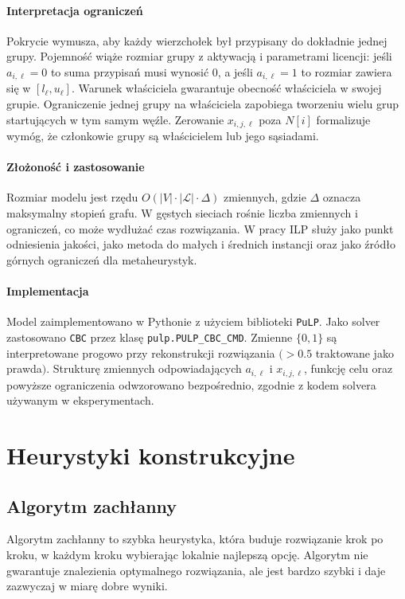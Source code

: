 \paragraph{Interpretacja ograniczeń}
Pokrycie wymusza, aby każdy wierzchołek był przypisany do dokładnie jednej grupy. Pojemność wiąże rozmiar grupy z aktywacją i parametrami licencji: jeśli \(a_{i,\ell}=0\) to suma przypisań musi wynosić 0, a jeśli \(a_{i,\ell}=1\) to rozmiar zawiera się w \([l_\ell,u_\ell]\). Warunek właściciela gwarantuje obecność właściciela w swojej grupie. Ograniczenie jednej grupy na właściciela zapobiega tworzeniu wielu grup startujących w tym samym węźle. Zerowanie \(x_{i,j,\ell}\) poza \(N[i]\) formalizuje wymóg, że członkowie grupy są właścicielem lub jego sąsiadami.

\paragraph{Złożoność i zastosowanie}
Rozmiar modelu jest rzędu \(O(|V|\cdot|\mathcal{L}|\cdot \Delta)\) zmiennych, gdzie \(\Delta\) oznacza maksymalny stopień grafu. W gęstych sieciach rośnie liczba zmiennych i ograniczeń, co może wydłużać czas rozwiązania. W pracy ILP służy jako punkt odniesienia jakości, jako metoda do małych i średnich instancji oraz jako źródło górnych ograniczeń dla metaheurystyk.

\paragraph{Implementacja}
Model zaimplementowano w Pythonie z użyciem biblioteki \texttt{PuLP}. Jako solver zastosowano \texttt{CBC} przez klasę \texttt{pulp.PULP\_CBC\_CMD}. Zmienne \(\{0,1\}\) są interpretowane progowo przy rekonstrukcji rozwiązania \((>0.5\) traktowane jako prawda\().\) Strukturę zmiennych odpowiadających \(a_{i,\ell}\) i \(x_{i,j,\ell}\), funkcję celu oraz powyższe ograniczenia odwzorowano bezpośrednio, zgodnie z kodem solvera używanym w eksperymentach.

\section{Heurystyki konstrukcyjne}

\subsection{Algorytm zachłanny}\label{subsec:greedy}

Algorytm zachłanny to szybka heurystyka, która buduje rozwiązanie krok po kroku, w każdym kroku wybierając lokalnie najlepszą opcję. Algorytm nie gwarantuje znalezienia optymalnego rozwiązania, ale jest bardzo szybki i daje zazwyczaj w miarę dobre wyniki.

